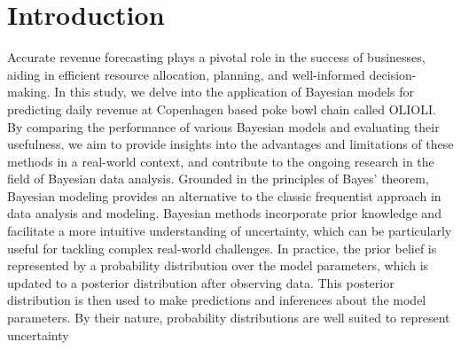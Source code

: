 \section{Introduction}


Accurate revenue forecasting plays a pivotal role in the success of businesses,
aiding in efficient resource allocation, planning, and well-informed
decision-making. In this study, we delve into the application of Bayesian
models for predicting daily revenue at Copenhagen based poke bowl chain called
OLIOLI. By comparing the performance of various Bayesian models and evaluating
their usefulness, we aim to provide insights into the advantages and
limitations of these methods in a real-world context, and contribute to the
ongoing research in the field of Bayesian data analysis.
Grounded in the principles of Bayes' theorem, Bayesian modeling provides an
alternative to the classic frequentist approach in data analysis and modeling.
Bayesian methods incorporate prior knowledge and facilitate a more intuitive
understanding of uncertainty, which can be particularly useful for tackling
complex real-world challenges.
In practice, the prior belief is represented by a probability distribution over
the model parameters, which is updated to a posterior distribution after
observing data. This posterior distribution is then used to make predictions
and inferences about the model parameters. By their nature, probability
distributions are well suited to represent uncertainty 


